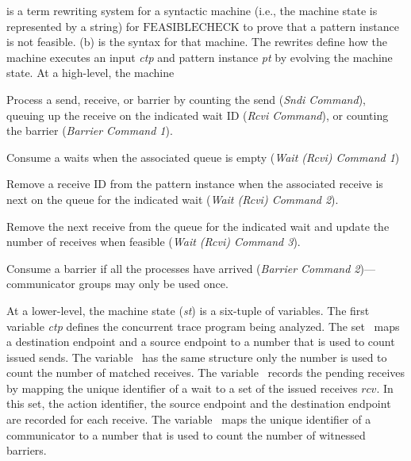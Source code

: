  is a term rewriting system for a syntactic
machine (i.e., the machine state is represented by a string) for
$\mathrm{FEASIBLECHECK}$ to prove that a pattern instance is not
feasible. (b) is the syntax for that machine. The
rewrites define how the machine executes an input \emph{ctp} and
pattern instance \emph{pt} by evolving the machine state. At a high-level, the machine
\begin{compactitem}
\item Process a send, receive, or barrier by counting the send (\emph{Sndi Command}), queuing up the receive on the indicated wait ID (\emph{Rcvi Command}), or counting the barrier (\emph{Barrier Command 1}).
\item Consume a waits when the associated queue is empty (\emph{Wait (Rcvi) Command 1})
\item Remove a receive ID from the pattern instance when the associated receive is next on the queue for the indicated wait (\emph{Wait (Rcvi) Command 2}).
\item Remove the next receive from the queue for the indicated wait and update the number of receives when feasible (\emph{Wait (Rcvi) Command 3}).
\item Consume a barrier if all the processes have arrived (\emph{Barrier Command 2})---communicator groups may only be used once.
\end{compactitem}
At a lower-level, the machine state (\textit{st}) is a six-tuple of variables. The first variable \textit{ctp} defines the concurrent trace program being analyzed. The set \epsnd\ maps a destination endpoint and a source endpoint to a number that is used to count issued sends. The variable \eprcv\ has the same structure only the number is used to count the number of matched receives. The variable \epwait\ records the pending receives by mapping the unique identifier of a wait to a set of the issued receives $\mathit{rcv}$. 
In this set, the action identifier, the source endpoint and the destination endpoint are recorded for each receive. The variable \epbarrier\ maps the unique identifier of a communicator to a number that is used to count the number of witnessed barriers.

